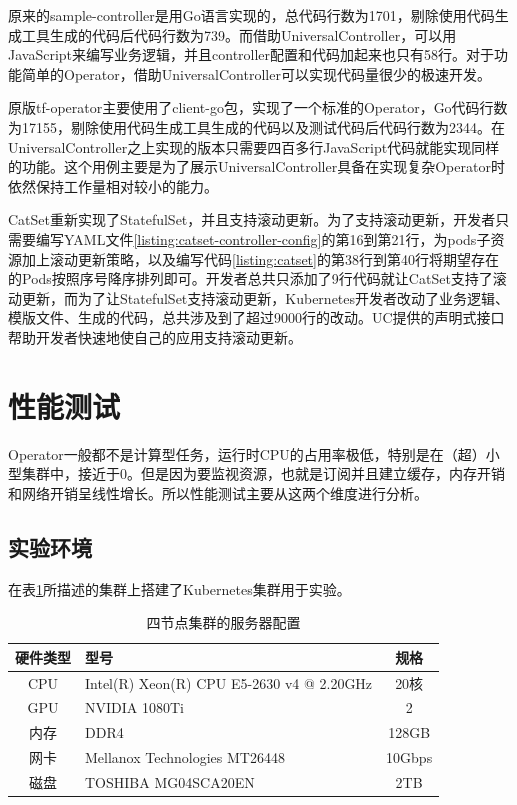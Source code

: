\documentclass[macfonts,master]{njuthesis}
\begin{document}
原来的sample-controller是用Go语言实现的，总代码行数为1701，剔除使用代码生成工具生成的代码后代码行数为739。而借助UniversalController，可以用JavaScript来编写业务逻辑，并且controller配置和代码加起来也只有58行。对于功能简单的Operator，借助UniversalController可以实现代码量很少的极速开发。

原版tf-operator主要使用了client-go包，实现了一个标准的Operator，Go代码行数为17155，剔除使用代码生成工具生成的代码以及测试代码后代码行数为2344。在UniversalController之上实现的版本只需要四百多行JavaScript代码就能实现同样的功能。这个用例主要是为了展示UniversalController具备在实现复杂Operator时依然保持工作量相对较小的能力。

CatSet重新实现了StatefulSet，并且支持滚动更新。为了支持滚动更新，开发者只需要编写YAML文件\ref{listing:catset-controller-config}的第16到第21行，为pods子资源加上滚动更新策略，以及编写代码\ref{listing:catset}的第38行到第40行将期望存在的Pods按照序号降序排列即可。开发者总共只添加了9行代码就让CatSet支持了滚动更新，而为了让StatefulSet支持滚动更新，Kubernetes开发者改动了业务逻辑、模版文件、生成的代码，总共涉及到了超过9000行的改动\cite{statefulsetupdate}。UC提供的声明式接口帮助开发者快速地使自己的应用支持滚动更新。

\section{性能测试}

Operator一般都不是计算型任务，运行时CPU的占用率极低，特别是在（超）小型集群中，接近于0。但是因为要监视资源，也就是订阅并且建立缓存，内存开销和网络开销呈线性增长。所以性能测试主要从这两个维度进行分析。

\subsection{实验环境}

在表\ref{table:test-env}所描述的集群上搭建了Kubernetes集群用于实验。
\begin{table}
  \centering
  \begin{tabular}{cp{60mm}c}
    \toprule
    \textbf{硬件类型} & \textbf{型号} & \textbf{规格} \\
    \midrule
    CPU  & Intel(R) Xeon(R) CPU E5-2630 v4 @ 2.20GHz  & 20核\\
    GPU  & NVIDIA 1080Ti   &  2 \\
    内存     & DDR4 & 128GB \\
    网卡    & Mellanox Technologies MT26448   & 10Gbps \\
    磁盘 & TOSHIBA MG04SCA20EN & 2TB \\
    \bottomrule
  \end{tabular}
  \caption{四节点集群的服务器配置}\label{table:test-env}
\end{table}
\end{document}

